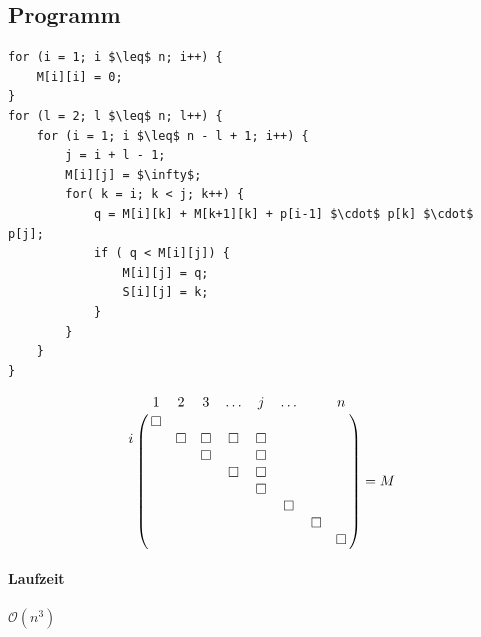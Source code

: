 \subsection{Programm}
\begin{lstlisting}[]
for (i = 1; i $\leq$ n; i++) {
	M[i][i] = 0;
}
for (l = 2; l $\leq$ n; l++) {
	for (i = 1; i $\leq$ n - l + 1; i++) {
		j = i + l - 1;
		M[i][j] = $\infty$;
		for( k = i; k < j; k++) {
			q = M[i][k] + M[k+1][k] + p[i-1] $\cdot$ p[k] $\cdot$ p[j];
			if ( q < M[i][j]) {
				M[i][j] = q;
				S[i][j] = k;
			}
		}
	}
}
\end{lstlisting}
\[ \bordermatrix {
	 &1			&2			&3			&\ldots		&j			&\ldots		& 			&n			\cr
	 &\square	&			& 			& 			&			& 			& 			& 			\cr
	i&			&\square	&\square	&\square	&\square	& 			& 			& 			\cr
	 &			&			&\square	&			&\square	&			&			&			\cr
	 &			&			&			&\square	&\square	&			&			&			\cr
	 &			&			&			&			&\square	&			&			&			\cr
	 &			&			&			&			&			&\square	&			&			\cr
	 &			&			&			&			&			&			&\square	&			\cr
	 &			&			&			&			&			&			&			&\square	\cr
} = M 
\]
\paragraph{Laufzeit} $\mathcal{O}(n^3)$